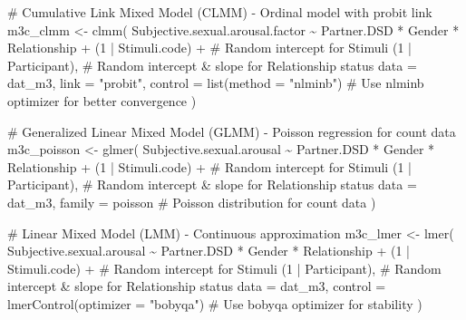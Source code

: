 \documentclass[
  bookmarksnumbered]{article}
\newenvironment{Shaded}{\begin{snugshade}}{\end{snugshade}}
\newcommand{\AttributeTok}[1]{\textcolor[rgb]{0.80,0.80,0.80}{#1}}
\newcommand{\CommentTok}[1]{\textcolor[rgb]{0.50,0.62,0.50}{#1}}
\newcommand{\DecValTok}[1]{\textcolor[rgb]{0.86,0.86,0.80}{#1}}
\newcommand{\FunctionTok}[1]{\textcolor[rgb]{0.94,0.94,0.56}{#1}}
\newcommand{\NormalTok}[1]{\textcolor[rgb]{0.80,0.80,0.80}{#1}}
\newcommand{\OtherTok}[1]{\textcolor[rgb]{0.94,0.94,0.56}{#1}}
\newcommand{\SpecialCharTok}[1]{\textcolor[rgb]{0.86,0.64,0.64}{#1}}
\newcommand{\StringTok}[1]{\textcolor[rgb]{0.80,0.58,0.58}{#1}}
\begin{document}
\begin{Shaded}
\begin{Highlighting}[]
\CommentTok{\# Cumulative Link Mixed Model (CLMM) {-} Ordinal model with probit link}
\NormalTok{m3c\_clmm }\OtherTok{\textless{}{-}} \FunctionTok{clmm}\NormalTok{(}
\NormalTok{  Subjective.sexual.arousal.factor }\SpecialCharTok{\textasciitilde{}}\NormalTok{ Partner.DSD }\SpecialCharTok{*}\NormalTok{ Gender }\SpecialCharTok{*}\NormalTok{ Relationship }\SpecialCharTok{+}
\NormalTok{    (}\DecValTok{1} \SpecialCharTok{|}\NormalTok{ Stimuli.code) }\SpecialCharTok{+} \CommentTok{\# Random intercept for Stimuli}
\NormalTok{    (}\DecValTok{1} \SpecialCharTok{|}\NormalTok{ Participant), }\CommentTok{\# Random intercept \& slope for Relationship status}
  \AttributeTok{data =}\NormalTok{ dat\_m3,}
  \AttributeTok{link =} \StringTok{"probit"}\NormalTok{,}
  \AttributeTok{control =} \FunctionTok{list}\NormalTok{(}\AttributeTok{method =} \StringTok{"nlminb"}\NormalTok{) }\CommentTok{\# Use \textquotesingle{}nlminb\textquotesingle{} optimizer for better convergence}
\NormalTok{)}

\CommentTok{\# Generalized Linear Mixed Model (GLMM) {-} Poisson regression for count data}
\NormalTok{m3c\_poisson }\OtherTok{\textless{}{-}} \FunctionTok{glmer}\NormalTok{(}
\NormalTok{  Subjective.sexual.arousal }\SpecialCharTok{\textasciitilde{}}\NormalTok{ Partner.DSD }\SpecialCharTok{*}\NormalTok{ Gender }\SpecialCharTok{*}\NormalTok{ Relationship }\SpecialCharTok{+}
\NormalTok{    (}\DecValTok{1} \SpecialCharTok{|}\NormalTok{ Stimuli.code) }\SpecialCharTok{+} \CommentTok{\# Random intercept for Stimuli}
\NormalTok{    (}\DecValTok{1} \SpecialCharTok{|}\NormalTok{ Participant), }\CommentTok{\# Random intercept \& slope for Relationship status}
  \AttributeTok{data =}\NormalTok{ dat\_m3,}
  \AttributeTok{family =}\NormalTok{ poisson }\CommentTok{\# Poisson distribution for count data}
\NormalTok{)}

\CommentTok{\# Linear Mixed Model (LMM) {-} Continuous approximation}
\NormalTok{m3c\_lmer }\OtherTok{\textless{}{-}} \FunctionTok{lmer}\NormalTok{(}
\NormalTok{  Subjective.sexual.arousal }\SpecialCharTok{\textasciitilde{}}\NormalTok{ Partner.DSD }\SpecialCharTok{*}\NormalTok{ Gender }\SpecialCharTok{*}\NormalTok{ Relationship }\SpecialCharTok{+}
\NormalTok{    (}\DecValTok{1} \SpecialCharTok{|}\NormalTok{ Stimuli.code) }\SpecialCharTok{+} \CommentTok{\# Random intercept for Stimuli}
\NormalTok{    (}\DecValTok{1} \SpecialCharTok{|}\NormalTok{ Participant), }\CommentTok{\# Random intercept \& slope for Relationship status}
  \AttributeTok{data =}\NormalTok{ dat\_m3,}
  \AttributeTok{control =} \FunctionTok{lmerControl}\NormalTok{(}\AttributeTok{optimizer =} \StringTok{"bobyqa"}\NormalTok{) }\CommentTok{\# Use \textquotesingle{}bobyqa\textquotesingle{} optimizer for stability}
\NormalTok{)}
\end{Highlighting}
\end{Shaded}
\end{document}
